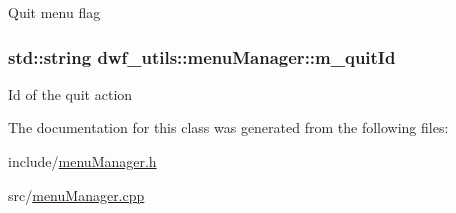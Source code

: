 \-Quit menu flag \hypertarget{classdwf__utils_1_1menu_manager_a5ca4d1705a71907d7148891314739f50}{
\subsubsection[{m\-\_\-quit\-Id}]{\setlength{\rightskip}{0pt plus 5cm}std\-::string {\bf dwf\-\_\-utils\-::menu\-Manager\-::m\-\_\-quit\-Id}}}\label{classdwf__utils_1_1menu_manager_a5ca4d1705a71907d7148891314739f50}
\-Id of the quit action 

\-The documentation for this class was generated from the following files\-:\begin{DoxyCompactItemize}
\item 
include/\hyperlink{menu_manager_8h}{menu\-Manager.\-h}\item 
src/\hyperlink{menu_manager_8cpp}{menu\-Manager.\-cpp}\end{DoxyCompactItemize}

